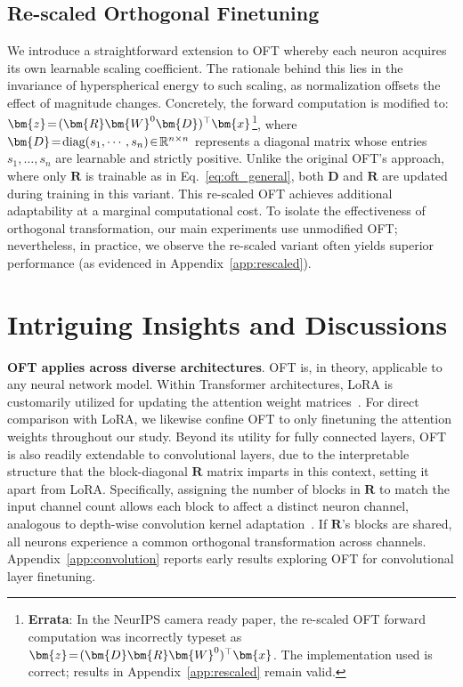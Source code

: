 \subsection{Re-scaled Orthogonal Finetuning}

We introduce a straightforward extension to OFT whereby each neuron acquires its own learnable scaling coefficient. The rationale behind this lies in the invariance of hyperspherical energy to such scaling, as normalization offsets the effect of magnitude changes. Concretely, the forward computation is modified to: $\thickmuskip=2mu \medmuskip=2mu\bm{z}=(\bm{R}\bm{W}^0\bm{D})^\top\bm{x}$\footnote{\textbf{Errata}: In the NeurIPS camera ready paper, the re-scaled OFT forward computation was incorrectly typeset as $\thickmuskip=2mu \medmuskip=2mu\bm{z}=(\bm{D}\bm{R}\bm{W}^0)^\top\bm{x}$. The implementation used is correct; results in Appendix~\ref{app:rescaled} remain valid.}, where $\thickmuskip=2mu \medmuskip=2mu\bm{D}=\text{diag}(s_1,\cdots,s_n)\in\mathbb{R}^{n\times n}$ represents a diagonal matrix whose entries $s_1,\ldots,s_n$ are learnable and strictly positive. Unlike the original OFT’s approach, where only $\bm{R}$ is trainable as in Eq.~\eqref{eq:oft_general}, both $\bm{D}$ and $\bm{R}$ are updated during training in this variant. This re-scaled OFT achieves additional adaptability at a marginal computational cost. To isolate the effectiveness of orthogonal transformation, our main experiments use unmodified OFT; nevertheless, in practice, we observe the re-scaled variant often yields superior performance (as evidenced in Appendix~\ref{app:rescaled}).

\section{Intriguing Insights and Discussions}

\textbf{OFT applies across diverse architectures}. OFT is, in theory, applicable to any neural network model. Within Transformer architectures, LoRA is customarily utilized for updating the attention weight matrices~\cite{hulora2022}. For direct comparison with LoRA, we likewise confine OFT to only finetuning the attention weights throughout our study. Beyond its utility for fully connected layers, OFT is also readily extendable to convolutional layers, due to the interpretable structure that the block-diagonal $\bm{R}$ matrix imparts in this context, setting it apart from LoRA. Specifically, assigning the number of blocks in $\bm{R}$ to match the input channel count allows each block to affect a distinct neuron channel, analogous to depth-wise convolution kernel adaptation~\cite{chollet2017xception}. If $\bm{R}$'s blocks are shared, all neurons experience a common orthogonal transformation across channels. Appendix~\ref{app:convolution} reports early results exploring OFT for convolutional layer finetuning.

